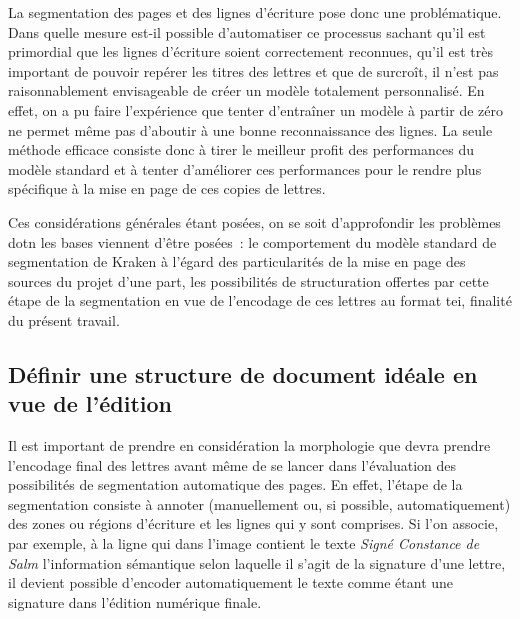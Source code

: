 \documentclass[a4paper,12pt,twoside]{book}
\begin{document}
				La {segmentation} des pages et des lignes d'écriture pose donc une problématique. Dans quelle mesure est-il possible d'automatiser ce processus sachant qu'il est primordial que les lignes d'écriture soient correctement reconnues, qu'il est très important de pouvoir repérer les titres des lettres et que de surcroît, il n'est pas raisonnablement envisageable de créer un modèle totalement personnalisé. En effet, on a pu faire l'expérience que tenter d'entraîner un modèle à partir de zéro ne permet même pas d'aboutir à une bonne reconnaissance des lignes. La seule méthode efficace consiste donc à tirer le meilleur profit des performances du modèle standard et à tenter d'améliorer ces performances pour le rendre plus spécifique à la mise en page de ces copies de lettres.
				
				Ces considérations générales étant posées, on se soit d'approfondir les problèmes dotn les bases viennent d'être posées~: le comportement du modèle standard de {segmentation} de Kraken à l'égard des particularités de la mise en page des sources du projet d'une part, les possibilités de structuration offertes par cette étape de la {segmentation} en vue de l'encodage de ces lettres au format \gls{tei}, finalité du présent travail.
					
			\subsection{Définir une structure de document idéale en vue de l'édition}
				Il est important de prendre en considération la morphologie que devra prendre l'encodage final des lettres avant même de se lancer dans l'évaluation des possibilités de {segmentation} automatique des pages. En effet, l'étape de la {segmentation} consiste à annoter (manuellement ou, si possible, automatiquement) des zones ou régions d'écriture et les lignes qui y sont comprises. Si l'on associe, par exemple, à la ligne qui dans l'image contient le texte \textit{Signé Constance de Salm} l'information sémantique selon laquelle il s'agit de la signature d'une lettre, il devient possible d'encoder automatiquement le texte comme étant une signature dans l'édition numérique finale.
				
\end{document}
